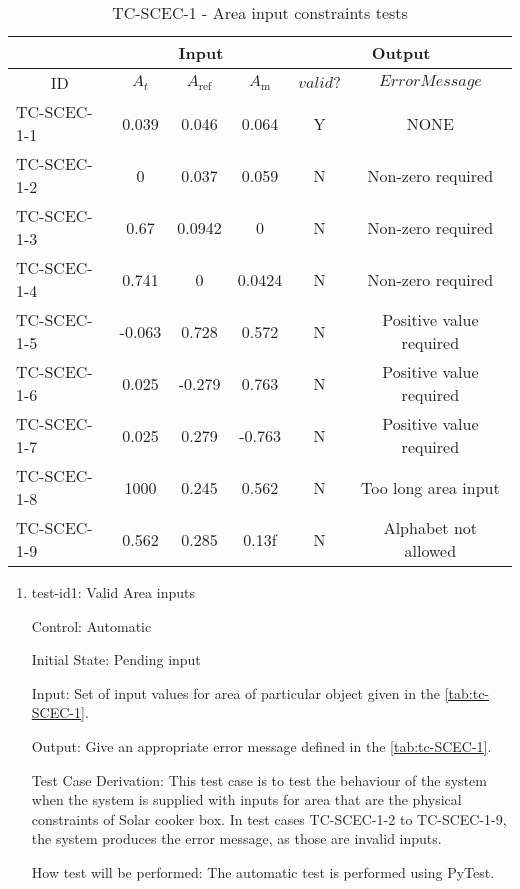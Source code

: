 \documentclass[12pt, titlepage]{article}
\begin{document}
\begin{table}[h!]
\begin{center}
\begin{tabular}{ lccccc }
\hline
\multicolumn{1}{l|}{}   & \multicolumn{3}{c|}{Input}                            & \multicolumn{2}{c}{Output} \\ 

\hline

\multicolumn{1}{c|}{ID} &   ${A_t}$   &   $A_\text{ref}$   &   \multicolumn{1}{c|}{${A_{\text{m}}}$}   &   $valid?$   &   $Error Message$ \\ \hline

TC-SCEC-1-1   &   0.039  & 0.046  & 0.064    &  Y  & NONE                         \\
TC-SCEC-1-2   &   0      & 0.037  & 0.059    &  N  & Non-zero required            \\
TC-SCEC-1-3   &   0.67   & 0.0942 & 0        &  N  & Non-zero required            \\ 
TC-SCEC-1-4   &   0.741  & 0      & 0.0424   &  N  & Non-zero required            \\
TC-SCEC-1-5   &   -0.063 & 0.728  & 0.572    &  N  & Positive value required      \\
TC-SCEC-1-6   &   0.025  & -0.279 & 0.763    &  N  & Positive value required      \\
TC-SCEC-1-7   &   0.025  & 0.279  & -0.763   &  N  & Positive value required      \\
TC-SCEC-1-8   &   1000   & 0.245  & 0.562    &  N  & Too long area input          \\
TC-SCEC-1-9   &   0.562  & 0.285  & 0.13f    &  N  & Alphabet not allowed         \\ 

\hline


\end{tabular}
\caption{TC-SCEC-1 - Area input constraints tests}
\label{tab:tc-SCEC-1}
\end{center}
\end{table}


\begin{enumerate}

\item{test-id1: Valid Area inputs  \\}

Control: Automatic
					
Initial State: Pending input 
					
Input: Set of input values for area of particular object given in the \autoref{tab:tc-SCEC-1}. 
					
Output: Give an appropriate error message defined in the \autoref{tab:tc-SCEC-1}. 

Test Case Derivation: This test case is to test the behaviour of the system when the system is supplied with inputs for area that are the physical constraints of Solar cooker box. In test cases TC-SCEC-1-2 to TC-SCEC-1-9, the system produces the error message, as those are invalid inputs.     
					
How test will be performed: The automatic test is performed using PyTest.  

\end{enumerate}
\end{document}
